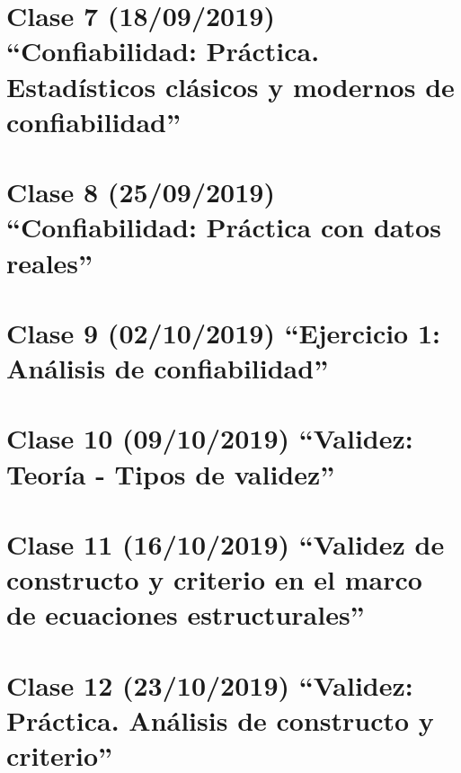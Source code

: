 \documentclass[11pt,]{article}
\begin{document}
\hypertarget{clase-7-18092019-confiabilidad-practica.-estadisticos-clasicos-y-modernos-de-confiabilidad}{%
\section{Clase 7 (18/09/2019) ``Confiabilidad: Práctica. Estadísticos
clásicos y modernos de
confiabilidad''}\label{clase-7-18092019-confiabilidad-practica.-estadisticos-clasicos-y-modernos-de-confiabilidad}}

\hypertarget{clase-8-25092019-confiabilidad-practica-con-datos-reales}{%
\section{Clase 8 (25/09/2019) ``Confiabilidad: Práctica con datos
reales''}\label{clase-8-25092019-confiabilidad-practica-con-datos-reales}}

\hypertarget{clase-9-02102019-ejercicio-1-analisis-de-confiabilidad}{%
\section{Clase 9 (02/10/2019) ``Ejercicio 1: Análisis de
confiabilidad''}\label{clase-9-02102019-ejercicio-1-analisis-de-confiabilidad}}

\hypertarget{clase-10-09102019-validez-teoria---tipos-de-validez}{%
\section{Clase 10 (09/10/2019) ``Validez: Teoría - Tipos de
validez''}\label{clase-10-09102019-validez-teoria---tipos-de-validez}}

\hypertarget{clase-11-16102019-validez-de-constructo-y-criterio-en-el-marco-de-ecuaciones-estructurales}{%
\section{Clase 11 (16/10/2019) ``Validez de constructo y criterio en el
marco de ecuaciones
estructurales''}\label{clase-11-16102019-validez-de-constructo-y-criterio-en-el-marco-de-ecuaciones-estructurales}}

\hypertarget{clase-12-23102019-validez-practica.-analisis-de-constructo-y-criterio}{%
\section{Clase 12 (23/10/2019) ``Validez: Práctica. Análisis de
constructo y
criterio''}\label{clase-12-23102019-validez-practica.-analisis-de-constructo-y-criterio}}
\end{document}
